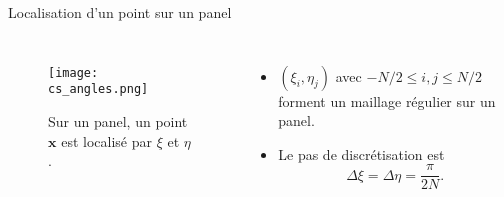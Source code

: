 \documentclass[11pt]{beamer}
\begin{document}
\begin{frame}{Localisation d'un point sur un panel}
\begin{columns}
\begin{figure}[htbp]
\begin{center}
\texttt{[image: cs\_angles.png]}
\end{center}
\caption{Sur un panel, un point $\mathbf{x}$ est localisé par $\xi$ et $\eta$.}
\end{figure}
\begin{itemize}
\item $(\xi_i, \eta_j)$ avec $-N/2 \leq i,j \leq N/2$ forment un maillage régulier sur un panel.
\item Le pas de discrétisation est
$$
\Delta \xi = \Delta \eta = \dfrac{\pi}{2N}.
$$ 
\end{itemize}
\end{columns}
\end{frame}
\end{document}
